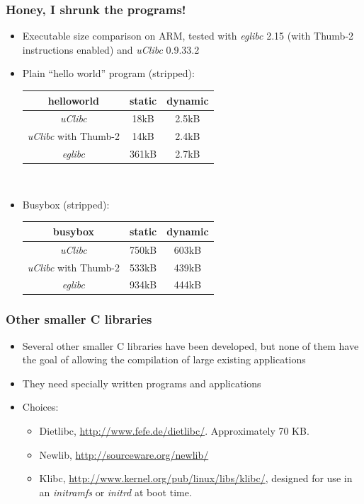 \begin{frame}
  \frametitle{Honey, I shrunk the programs!}
  \begin{itemize}
  \item Executable size comparison on ARM, tested with {\em eglibc}
  2.15 (with Thumb-2 instructions enabled) and {\em uClibc} 0.9.33.2
  \item Plain ``hello world'' program (stripped): \\
    \begin{tabular}{| c || c | c |} \hline
    helloworld & static & dynamic \\ \hline
    {\em uClibc} & 18kB & 2.5kB \\
    {\em uClibc} with Thumb-2 & 14kB & 2.4kB \\
    {\em eglibc} & 361kB & 2.7kB \\ \hline
    \end{tabular} \\
  \item Busybox (stripped): \\
    \begin{tabular}{| c || c | c |} \hline
    busybox & static & dynamic \\ \hline
    {\em uClibc} & 750kB & 603kB \\
    {\em uClibc} with Thumb-2 & 533kB & 439kB \\
    {\em eglibc} & 934kB & 444kB \\ \hline
    \end{tabular}
  \end{itemize}
\end{frame}

\begin{frame}
  \frametitle{Other smaller C libraries}
  \begin{itemize}
  \item Several other smaller C libraries have been developed, but
    none of them have the goal of allowing the compilation of large
    existing applications
  \item They need specially written programs and applications
  \item Choices:
    \begin{itemize}
    \item Dietlibc, \url{http://www.fefe.de/dietlibc/}. Approximately
      70 KB.
    \item Newlib, \url{http://sourceware.org/newlib/}
    \item Klibc, \url{http://www.kernel.org/pub/linux/libs/klibc/},
      designed for use in an {\em initramfs} or {\em initrd} at boot
      time.
    \end{itemize}
  \end{itemize}
\end{frame}

